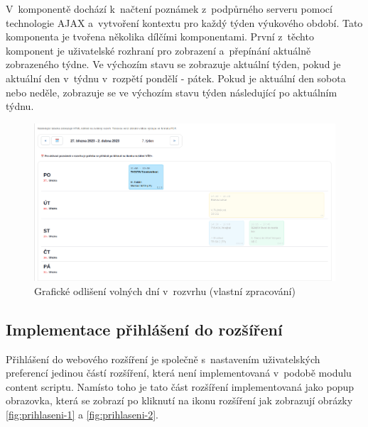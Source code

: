 V~komponentě  dochází k~načtení poznámek z~podpůrného serveru pomocí technologie AJAX a~vytvoření kontextu pro každý týden výukového období. Tato komponenta je tvořena několika dílčími komponentami. První z~těchto komponent je uživatelské rozhraní pro zobrazení a~přepínání aktuálně zobrazeného týdne. Ve výchozím stavu se zobrazuje aktuální týden, pokud je aktuální den v~týdnu v~rozpětí pondělí - pátek. Pokud je aktuální den sobota nebo neděle, zobrazuje se ve výchozím stavu týden následující po aktuálním týdnu.   


\begin{figure}[H]\centering
    \includegraphics[width=\textwidth]{img/rozvrh-volne-dny.png}
    \caption{Grafické odlišení volných dní v~rozvrhu (vlastní zpracování)}
    \label{fig:rovrh-volne-dny}
\end{figure}

\subsection{Implementace přihlášení do rozšíření}

Přihlášení do webového rozšíření je společně s~nastavením uživatelských preferencí jedinou částí rozšíření, která není implementovaná v~podobě modulu content scriptu. Namísto toho je tato část rozšíření implementovaná jako popup obrazovka, která se zobrazí po kliknutí na ikonu rozšíření jak zobrazují obrázky \ref{fig:prihlaseni-1} a \ref{fig:prihlaseni-2}.

